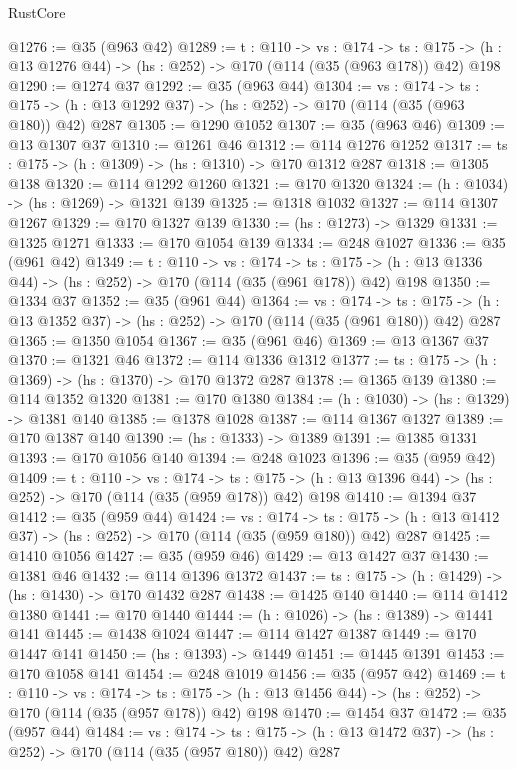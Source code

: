 \begin{lexlean}{RustCore}
\begin{coremodule}
@1276 := @35 (@963 @42)
@1289 := {t : @110} ->
  {vs : @174} ->
  {ts : @175} -> (h : @13 @1276 @44) -> (hs : @252) -> @170 (@114 (@35 (@963 @178)) @42) @198
@1290 := @1274 @37
@1292 := @35 (@963 @44)
@1304 := {vs : @174} ->
  {ts : @175} -> (h : @13 @1292 @37) -> (hs : @252) -> @170 (@114 (@35 (@963 @180)) @42) @287
@1305 := @1290 @1052
@1307 := @35 (@963 @46)
@1309 := @13 @1307 @37
@1310 := @1261 @46
@1312 := @114 @1276 @1252
@1317 := {ts : @175} -> (h : @1309) -> (hs : @1310) -> @170 @1312 @287
@1318 := @1305 @138
@1320 := @114 @1292 @1260
@1321 := @170 @1320
@1324 := (h : @1034) -> (hs : @1269) -> @1321 @139
@1325 := @1318 @1032
@1327 := @114 @1307 @1267
@1329 := @170 @1327 @139
@1330 := (hs : @1273) -> @1329
@1331 := @1325 @1271
@1333 := @170 @1054 @139
@1334 := @248 @1027
@1336 := @35 (@961 @42)
@1349 := {t : @110} ->
  {vs : @174} ->
  {ts : @175} -> (h : @13 @1336 @44) -> (hs : @252) -> @170 (@114 (@35 (@961 @178)) @42) @198
@1350 := @1334 @37
@1352 := @35 (@961 @44)
@1364 := {vs : @174} ->
  {ts : @175} -> (h : @13 @1352 @37) -> (hs : @252) -> @170 (@114 (@35 (@961 @180)) @42) @287
@1365 := @1350 @1054
@1367 := @35 (@961 @46)
@1369 := @13 @1367 @37
@1370 := @1321 @46
@1372 := @114 @1336 @1312
@1377 := {ts : @175} -> (h : @1369) -> (hs : @1370) -> @170 @1372 @287
@1378 := @1365 @139
@1380 := @114 @1352 @1320
@1381 := @170 @1380
@1384 := (h : @1030) -> (hs : @1329) -> @1381 @140
@1385 := @1378 @1028
@1387 := @114 @1367 @1327
@1389 := @170 @1387 @140
@1390 := (hs : @1333) -> @1389
@1391 := @1385 @1331
@1393 := @170 @1056 @140
@1394 := @248 @1023
@1396 := @35 (@959 @42)
@1409 := {t : @110} ->
  {vs : @174} ->
  {ts : @175} -> (h : @13 @1396 @44) -> (hs : @252) -> @170 (@114 (@35 (@959 @178)) @42) @198
@1410 := @1394 @37
@1412 := @35 (@959 @44)
@1424 := {vs : @174} ->
  {ts : @175} -> (h : @13 @1412 @37) -> (hs : @252) -> @170 (@114 (@35 (@959 @180)) @42) @287
@1425 := @1410 @1056
@1427 := @35 (@959 @46)
@1429 := @13 @1427 @37
@1430 := @1381 @46
@1432 := @114 @1396 @1372
@1437 := {ts : @175} -> (h : @1429) -> (hs : @1430) -> @170 @1432 @287
@1438 := @1425 @140
@1440 := @114 @1412 @1380
@1441 := @170 @1440
@1444 := (h : @1026) -> (hs : @1389) -> @1441 @141
@1445 := @1438 @1024
@1447 := @114 @1427 @1387
@1449 := @170 @1447 @141
@1450 := (hs : @1393) -> @1449
@1451 := @1445 @1391
@1453 := @170 @1058 @141
@1454 := @248 @1019
@1456 := @35 (@957 @42)
@1469 := {t : @110} ->
  {vs : @174} ->
  {ts : @175} -> (h : @13 @1456 @44) -> (hs : @252) -> @170 (@114 (@35 (@957 @178)) @42) @198
@1470 := @1454 @37
@1472 := @35 (@957 @44)
@1484 := {vs : @174} ->
  {ts : @175} -> (h : @13 @1472 @37) -> (hs : @252) -> @170 (@114 (@35 (@957 @180)) @42) @287

\end{coremodule}
\end{lexlean}
